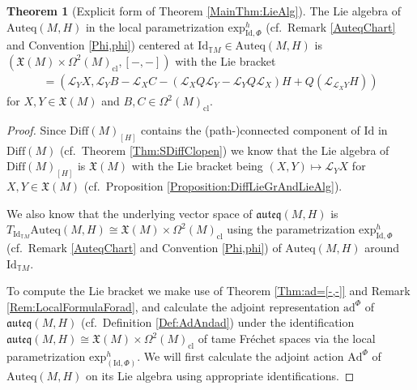 \documentclass[12pt,a4paper]{article}
\theoremstyle{plain}
\theoremstyle{definition}
\newtheorem*{theorem*}{Theorem}
\newcommand{\VFs}{\mathfrak{X}(M)}
\newcommand{\Forms}[1]{\Omega^{#1}(M)}
\newcommand{\ClForms}[1]{\Forms{#1}_{\mathrm{cl}}}
\newcommand{\LieD}{\mathcal{L}}
\newcommand{\Diff}{\mathrm{Diff}(M)}
\newcommand{\SDiff}{\mathrm{Diff}(M)_{[H]}}
\newcommand{\Auteq}{\mathrm{Auteq}(M,H)}
\newcommand{\auteq}{\mathfrak{auteq}(M,H)}
\newcommand{\exh}{\mathrm{exp}^h}
\newcommand{\Id}{\mathrm{Id}}
\newcommand{\GenTM}{\mathbb TM}
\begin{document}
\begin{theorem*}[Explicit form of Theorem \ref{MainThm:LieAlg}]
The Lie algebra of $\Auteq$ in the local parametrization $\exh_{\Id,\Phi}$ (cf.~Remark \ref{AuteqChart} and Convention \ref{Phi,phi}) centered at $\mathrm{Id}_{\GenTM}\in \Auteq$ is
$(\VFs\times \ClForms{2},[-,-])$ with the Lie bracket
\begin{align*}
    [(X,B),(Y,C)]=(\LieD_YX,\LieD_YB-\LieD_XC-(\LieD_XQ\LieD_Y-\LieD_YQ\LieD_X)H+Q(\LieD_{\LieD_XY}H))
\end{align*}
for $X,Y\in \VFs$ and $B,C\in \ClForms{2}$. 
\end{theorem*}
\begin{proof}
Since $\SDiff$ contains the (path-)connected component of $\Id$ in $\Diff$ (cf.~Theorem \ref{Thm:SDiffClopen}) we know that the Lie algebra of $\SDiff$ is $\VFs$ with the Lie bracket being $(X,Y)\mapsto \LieD_YX$ for $X,Y\in \VFs$ (cf.~Proposition \ref{Proposition:DiffLieGrAndLieAlg}). 

We also know that the underlying vector space of $\auteq$ is $T_{\mathrm{Id}_{\GenTM}}\Auteq\cong \VFs\times \ClForms{2}$ using the parametrization $\exh_{\Id,\Phi}$ (cf.~Remark \ref{AuteqChart} and Convention \ref{Phi,phi}) of $\Auteq$ around $\mathrm{Id}_{\GenTM}$. 

To compute the Lie bracket we make use of Theorem \ref{Thm:ad=[-,-]} and Remark \ref{Rem:LocalFormulaForad}, and calculate the adjoint representation $\mathrm{ad}^\Phi$ of $\auteq$ (cf.~Definition \ref{Def:AdAndad}) under the identification $\auteq \cong \VFs \times \ClForms{2}$ of tame Fréchet spaces via the local parametrization $\exh_{(\Id,\Phi)}$. We will first calculate the adjoint action $\mathrm{Ad}^\Phi$ of $\Auteq$ on its Lie algebra using appropriate identifications. 


\end{proof}
\end{document}
